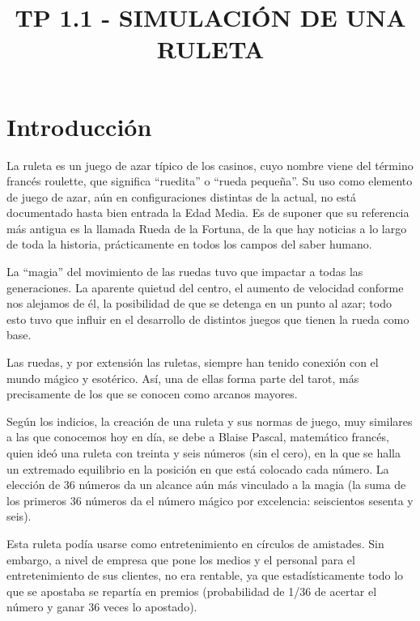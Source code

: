 


\title{TP 1.1 - SIMULACIÓN DE UNA RULETA}


\maketitle
\begin{abstract}
\end{abstract}


\section{Introducción}
La ruleta es un juego de azar típico de los casinos, cuyo nombre viene del término francés roulette, que significa ``ruedita'' o ``rueda pequeña''. Su uso como elemento de juego de azar, aún en configuraciones distintas de la actual, no está documentado hasta bien entrada la Edad Media. Es de suponer que su referencia más antigua es la llamada Rueda de la Fortuna, de la que hay noticias a lo largo de toda la historia, prácticamente en todos los campos del saber humano.

La ``magia'' del movimiento de las ruedas tuvo que impactar a todas las generaciones. La aparente quietud del centro, el aumento de velocidad conforme nos alejamos de él, la posibilidad de que se detenga en un punto al azar; todo esto tuvo que influir en el desarrollo de distintos juegos que tienen la rueda como base.

Las ruedas, y por extensión las ruletas, siempre han tenido conexión con el mundo mágico y esotérico. Así, una de ellas forma parte del tarot, más precisamente de los que se conocen como arcanos mayores.

Según los indicios, la creación de una ruleta y sus normas de juego, muy similares a las que conocemos hoy en día, se debe a Blaise Pascal, matemático francés, quien ideó una ruleta con treinta y seis números (sin el cero), en la que se halla un extremado equilibrio en la posición en que está colocado cada número. La elección de 36 números da un alcance aún más vinculado a la magia (la suma de los primeros 36 números da el número mágico por excelencia: seiscientos sesenta y seis).

Esta ruleta podía usarse como entretenimiento en círculos de amistades. Sin embargo, a nivel de empresa que pone los medios y el personal para el entretenimiento de sus clientes, no era rentable, ya que estadísticamente todo lo que se apostaba se repartía en premios (probabilidad de 1/36 de acertar el número y ganar 36 veces lo apostado).

